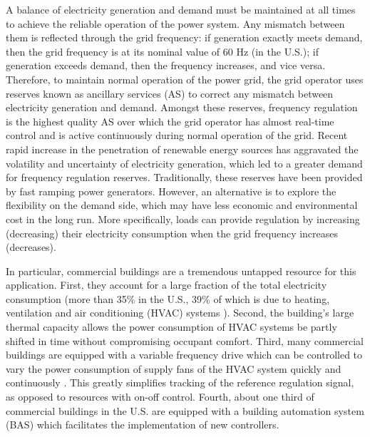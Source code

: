 \documentclass[../thesis.tex]{subfiles}
\begin{document}
A balance of electricity generation and demand must be maintained at all times to achieve the reliable operation of the power system.
Any mismatch between them is reflected through the grid frequency: if generation exactly meets demand, then the grid frequency is at its nominal value of 60 Hz (in the U.S.); if generation exceeds demand, then the frequency increases, and vice versa.
Therefore, to maintain normal operation of the power grid, the grid operator uses reserves known as ancillary services (AS) to correct any mismatch between electricity generation and demand.
Amongst these reserves, frequency regulation is the highest quality AS over which the grid operator has almost real-time control and is active continuously during normal operation of the grid.
Recent rapid increase in the penetration of renewable energy sources has aggravated the volatility and uncertainty of electricity generation, which led to a greater demand for frequency regulation reserves.
Traditionally, these reserves have been provided by fast ramping power generators.
However, an alternative is to explore the flexibility on the demand side, which may have less economic and environmental cost in the long run. 
More specifically, loads can provide regulation by increasing (decreasing) their electricity consumption when the grid frequency increases (decreases).

In particular, commercial buildings are a tremendous untapped resource for this application. 
First, they account for a large fraction of the total electricity consumption (more than 35\% in the U.S., 39\% of which is due to heating, ventilation and air conditioning (HVAC) systems \cite{USenergy:2017}). 
Second, the building's large thermal capacity allows the power consumption of HVAC systems be partly shifted in time without compromising occupant comfort. 
Third, many commercial buildings are equipped with a variable frequency drive which can be controlled to vary the power consumption of supply fans of the HVAC system quickly and continuously \cite{Hao:2012demandresponse}. This greatly simplifies tracking of the reference regulation signal, as opposed to resources with on-off control.
Fourth, about one third of commercial buildings in the U.S. are equipped with a building automation system (BAS) \cite{Braun:2012} which facilitates the implementation of new controllers.
\end{document}
